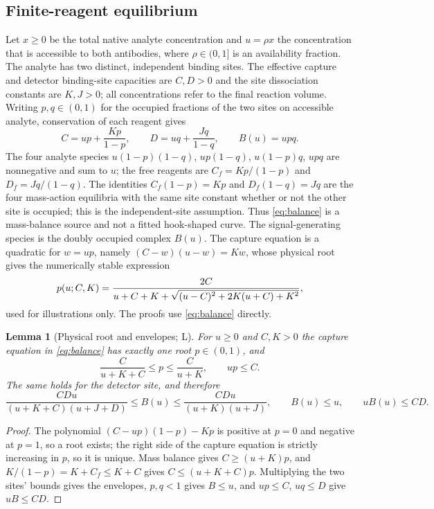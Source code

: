 \documentclass[11pt]{article}
\theoremstyle{plain}
\newtheorem{lemma}[theorem]{Lemma}
\theoremstyle{definition}
\numberwithin{equation}{section}
\newcommand{\Lean}{\textsf{L}}   %
\begin{document}
\subsection{Finite-reagent equilibrium}
Let $x\ge0$ be the total native analyte concentration and $u=\rho x$ the
concentration that is accessible to both antibodies, where $\rho\in(0,1]$ is an
availability fraction. The analyte has two distinct, independent binding sites.
The effective capture and detector binding-site capacities are $C,D>0$ and the
site dissociation constants are $K,J>0$; all concentrations refer to the final
reaction volume. Writing $p,q\in(0,1)$ for the occupied fractions of the two sites
on accessible analyte, conservation of each reagent gives
\begin{equation}\label{eq:balance}
 C=up+\frac{Kp}{1-p},\qquad D=uq+\frac{Jq}{1-q},\qquad B(u)=upq .
\end{equation}
The four analyte species $u(1-p)(1-q)$, $up(1-q)$, $u(1-p)q$, $upq$ are
nonnegative and sum to $u$; the free reagents are $C_f=Kp/(1-p)$ and
$D_f=Jq/(1-q)$. The identities $C_f(1-p)=Kp$ and $D_f(1-q)=Jq$ are the four
mass-action equilibria with the same site constant whether or not the other site is
occupied; this is the independent-site assumption. Thus \eqref{eq:balance} is a
mass-balance source and not a fitted hook-shaped curve. The signal-generating
species is the doubly occupied complex $B(u)$. The capture equation is a quadratic
for $w=up$, namely $(C-w)(u-w)=Kw$, whose physical root gives the numerically stable
expression
\begin{equation}\label{eq:root}
 p(u;C,K)=\frac{2C}{u+C+K+\sqrt{\smash[b]{(u-C)^2+2K(u+C)+K^2}}} ,
\end{equation}
used for illustrations only. The proofs use \eqref{eq:balance} directly.

\begin{lemma}[Physical root and envelopes; \Lean]\label{lem:source}
For $u\ge0$ and $C,K>0$ the capture equation in \eqref{eq:balance} has exactly one
root $p\in(0,1)$, and
\begin{equation}\label{eq:pbounds}
 \frac{C}{u+K+C}\le p\le\frac{C}{u+K},\qquad up\le C .
\end{equation}
The same holds for the detector site, and therefore
\begin{equation}\label{eq:envelopes}
 \frac{CDu}{(u+K+C)(u+J+D)}\le B(u)\le\frac{CDu}{(u+K)(u+J)},
 \qquad B(u)\le u,\qquad uB(u)\le CD .
\end{equation}
\end{lemma}
\begin{proof}
The polynomial $(C-up)(1-p)-Kp$ is positive at $p=0$ and negative at $p=1$, so a
root exists; the right side of the capture equation is strictly increasing in $p$,
so it is unique. Mass balance gives $C\ge(u+K)p$, and $K/(1-p)=K+C_f\le K+C$ gives
$C\le(u+K+C)p$. Multiplying the two sites' bounds gives the envelopes, $p,q<1$
gives $B\le u$, and $up\le C$, $uq\le D$ give $uB\le CD$.
\end{proof}
\end{document}

